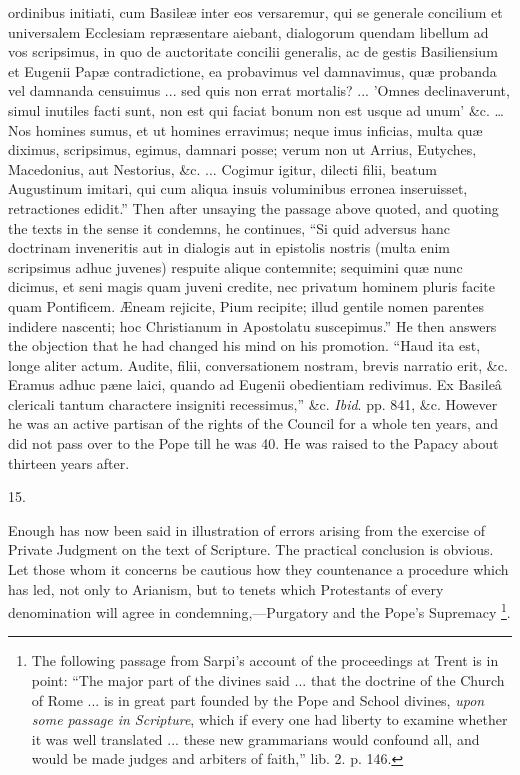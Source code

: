 {ordinibus initiati, cum Basileæ inter eos versaremur, qui se generale
concilium et universalem Ecclesiam repræsentare aiebant, dialogorum
quendam libellum ad vos scripsimus, in quo de auctoritate concilii
generalis, ac de gestis Basiliensium et Eugenii Papæ contradictione,
ea probavimus vel damnavimus, quæ probanda vel damnanda censuimus ...
sed quis non errat mortalis? ... 'Omnes declinaverunt, simul inutiles
facti sunt, non est qui faciat bonum non est usque ad unum' \&c.
… Nos homines sumus, et ut homines erravimus; neque imus inficias,
multa quæ diximus, scripsimus, egimus, damnari posse; verum non ut
Arrius, Eutyches, Macedonius, aut Nestorius, \&c. ... Cogimur
igitur, dilecti filii, beatum Augustinum imitari, qui cum aliqua
insuis voluminibus erronea inseruisset, retractiones edidit.''
Then after unsaying the passage above quoted, and quoting the texts in
the sense it condemns, he continues, ``Si quid adversus hanc
doctrinam inveneritis aut in dialogis aut in epistolis nostris (multa
enim scripsimus adhuc juvenes) respuite alique contemnite; sequimini
quæ nunc dicimus, et seni magis quam juveni credite, nec privatum
hominem pluris facite quam Pontificem. Æneam rejicite, Pium recipite;
illud gentile nomen parentes indidere nascenti; hoc Christianum in
Apostolatu suscepimus.'' He then answers the objection that he had
changed his mind on his promotion. ``Haud ita est, longe aliter
actum. Audite, filii, conversationem nostram, brevis narratio erit,
\&c. Eramus adhuc pæne laici, quando ad Eugenii obedientiam
redivimus. Ex Basileâ clericali tantum charactere insigniti recessimus,'' \&c. \emph{Ibid}. pp. 841, \&c. However he was
an active partisan of the rights of the Council for a whole ten years,
and did not pass over to the Pope till he was 40. He was raised to the
Papacy about thirteen years after.}

15.

Enough has now been said in illustration of errors arising from the
exercise of Private Judgment on the text of Scripture. The practical
conclusion is obvious. Let those whom it concerns be cautious how they
countenance a procedure which has led, not only to Arianism, but to
tenets which Protestants of every denomination will agree in
condemning,—Purgatory and the Pope's Supremacy \footnote{The following passage from Sarpi's account
of the proceedings at Trent is in point: ``The major part of the
divines said ... that the doctrine of the Church of Rome ... is in
great part founded by the Pope and School divines, \emph{upon some
passage in Scripture}, which if every one had liberty to examine
whether it was well translated ... these new grammarians would
confound all, and would be made judges and arbiters of faith,''
lib. 2. p. 146.}.

